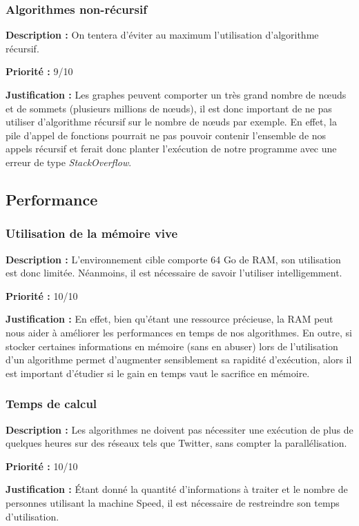 \begin{titlepage}
\subsubsection{Algorithmes non-récursif}
{
\textbf{Description :} On tentera d'éviter au maximum l'utilisation d'algorithme récursif.

\textbf{Priorité :} 9/10

\textbf{Justification :} Les graphes peuvent comporter un très grand nombre de nœuds et de sommets (plusieurs millions de nœuds), il est donc important de ne pas utiliser d'algorithme récursif sur le nombre de nœuds par exemple. En effet, la pile d'appel de fonctions pourrait ne pas pouvoir contenir l'ensemble de nos appels récursif et ferait donc planter l'exécution de notre programme avec une erreur de type \textit{StackOverflow}.
}

\subsection{Performance}
\subsubsection{Utilisation de la mémoire vive}
{
\textbf{Description :} L'environnement cible comporte 64 Go de RAM, son utilisation est donc limitée. Néanmoins, il est nécessaire de savoir l'utiliser intelligemment.

\textbf{Priorité :} 10/10

\textbf{Justification :} En effet, bien qu'étant une ressource précieuse, la RAM peut nous aider à améliorer les performances en temps de nos algorithmes. En outre, si stocker certaines informations en mémoire (sans en abuser) lors de l'utilisation d'un algorithme permet d'augmenter sensiblement sa rapidité d'exécution, alors il est important d'étudier si le gain en temps vaut le sacrifice en mémoire.
}

\subsubsection{Temps de calcul}
{
\textbf{Description :} Les algorithmes ne doivent pas nécessiter une exécution de plus de quelques heures sur des réseaux tels que Twitter, sans compter la parallélisation.

\textbf{Priorité :} 10/10

\textbf{Justification :} Étant donné la quantité d'informations à traiter et le nombre de personnes utilisant la machine Speed, il est nécessaire de restreindre son temps d'utilisation.
}


\end{titlepage}
